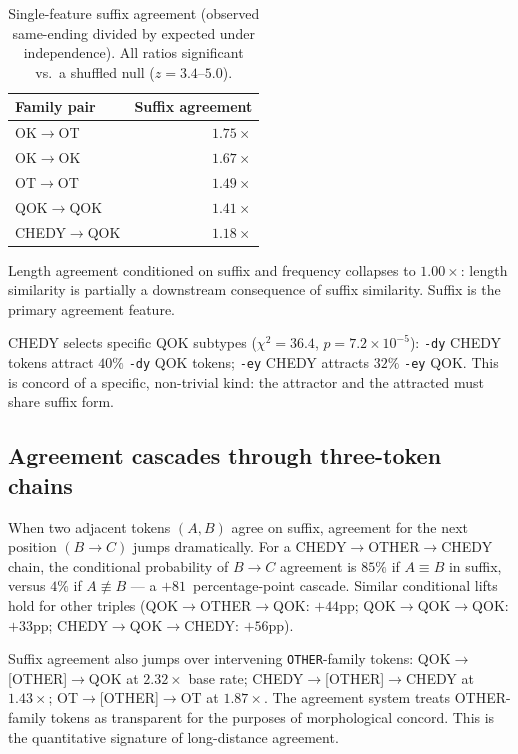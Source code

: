 \documentclass[11pt]{article}
\begin{document}
\begin{table}[ht]
  \centering
  \caption{Single-feature suffix agreement (observed same-ending divided by
  expected under independence). All ratios significant vs.~a shuffled null
  ($z = 3.4$--$5.0$).}
  \label{tab:agreement}
  \begin{tabular}{lr}
    \toprule
    Family pair & Suffix agreement \\
    \midrule
    OK$\to$OT    & $1.75\times$ \\
    OK$\to$OK    & $1.67\times$ \\
    OT$\to$OT    & $1.49\times$ \\
    QOK$\to$QOK  & $1.41\times$ \\
    CHEDY$\to$QOK & $1.18\times$ \\
    \bottomrule
  \end{tabular}
\end{table}

Length agreement conditioned on suffix and frequency collapses to
$1.00\times$: length similarity is partially a downstream consequence of
suffix similarity. Suffix is the primary agreement feature.

CHEDY selects specific QOK subtypes ($\chi^2 = 36.4$, $p = 7.2 \times
10^{-5}$): \texttt{-dy} CHEDY tokens attract $40\%$ \texttt{-dy} QOK
tokens; \texttt{-ey} CHEDY attracts $32\%$ \texttt{-ey} QOK. This is
concord of a specific, non-trivial kind: the attractor and the attracted
must share suffix form.

\subsection{Agreement cascades through three-token chains}

When two adjacent tokens $(A, B)$ agree on suffix, agreement for the next
position $(B \to C)$ jumps dramatically. For a CHEDY$\to$OTHER$\to$CHEDY
chain, the conditional probability of $B \to C$ agreement is $85\%$ if
$A \equiv B$ in suffix, versus $4\%$ if $A \not\equiv B$ --- a
$+81$~percentage-point cascade. Similar conditional lifts hold for other
triples (QOK$\to$OTHER$\to$QOK: $+44$pp; QOK$\to$QOK$\to$QOK: $+33$pp;
CHEDY$\to$QOK$\to$CHEDY: $+56$pp).

Suffix agreement also jumps over intervening \texttt{OTHER}-family tokens:
QOK$\to$[OTHER]$\to$QOK at $2.32\times$ base rate;
CHEDY$\to$[OTHER]$\to$CHEDY at $1.43\times$; OT$\to$[OTHER]$\to$OT at
$1.87\times$. The agreement system treats OTHER-family tokens as
transparent for the purposes of morphological concord. This is the
quantitative signature of long-distance agreement.
\end{document}
